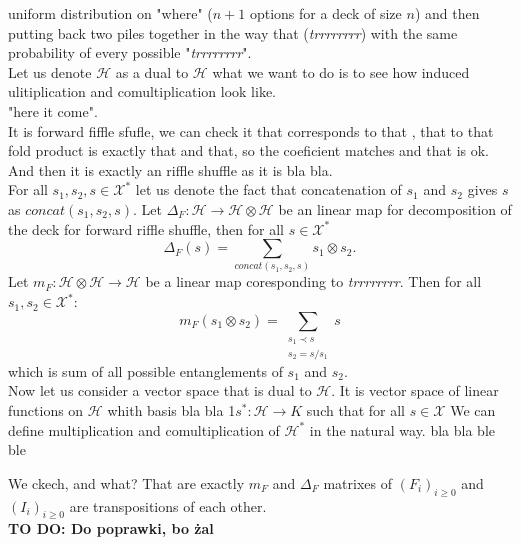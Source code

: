 \documentclass[a4paper, 12pt]{report}
\newcommand{\todo}[1]{\hfill \break \textbf{\Huge TO DO: #1 \hfill \break}\normalsize}
\begin{document}
uniform distribution on "where" ($n+1$ options for a deck of size $n$) and then putting back 
two piles together in the way that  
(\textit{trrrrrrrr}) with 
the same probability of every possible "\textit{trrrrrrrr}". \\
Let us denote $\mathcal{H}$ as a dual to $\mathcal{H}$ what we want to do is to see how induced 
ulitiplication and comultiplication look like. \\
"here it come". \\
It is forward fiffle sfufle, we can check it 
that corresponds to that , that to that
fold product is exactly that and that, so the coeficient matches and that is ok. \\
And then it is exactly an riffle shuffle as it is bla bla. \\
For all $s_1, s_2, s \in \mathcal{X}^*$ let us denote the fact that concatenation of $s_1$ and $s_2$ gives 
$s$ as $concat(s_1, s_2, s)$.
Let $\Delta_F : \mathcal{H} \to \mathcal{H} \otimes \mathcal{H}$ be an linear map for decomposition 
of the deck for forward riffle shuffle, then for all $s \in \mathcal{X}^*$
\begin{equation*}
\Delta_F(s) = \sum_{concat(s_1, s_2, s)} s_1 \otimes s_2.
\end{equation*}
Let $m_F : \mathcal{H} \otimes \mathcal{H} \to \mathcal{H}$ be a linear map coresponding to 
\textit{trrrrrrrr}. Then for all $s_1, s_2 \in \mathcal{X}^*$:
\begin{equation*}
m_F (s_1 \otimes s_2) = \sum_{\substack{s_1 \prec s \\ s_2 = s/s_1} } s
\end{equation*}
which is sum of all possible entanglements of $s_1$ and $s_2$.\\[8pt]
Now let us consider a vector space that is dual to $\mathcal{H}$. It is vector space of linear functions on 
$\mathcal{H}$
whith basis bla bla
1$s^* : \mathcal{H} \to K$ such that for all $s \in \mathcal{X }$
We can define multiplication and comultiplication of $\mathcal{H}^*$ in the natural way.
bla bla
ble ble

We ckech, and what? That are exactly $m_F$ and $\Delta_F$ matrixes of $(F_i)_{i \geq 0}$ and $(I_i)_{i 
\geq 0}$ 
are transpositions of each other.\\
\todo{Do poprawki, bo żal}
\end{document}
